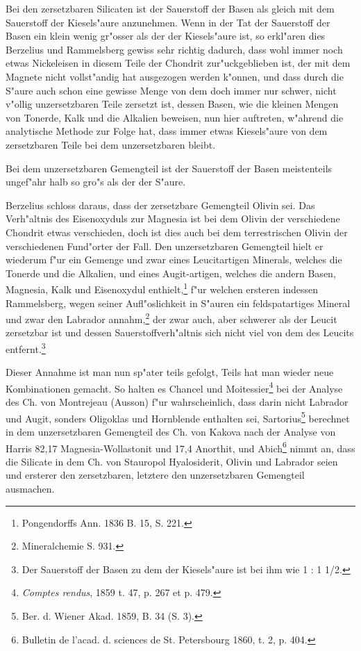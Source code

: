 \documentclass[a4paper, 11pt, oneside]{article}
\begin{document}
Bei den zersetzbaren Silicaten ist der Sauerstoff der Basen als gleich mit dem Sauerstoff der Kiesels"aure anzunehmen. Wenn in der Tat der Sauerstoff der Basen ein klein wenig gr"osser als der der Kiesels"aure ist, so erkl"aren dies Berzelius und Rammelsberg gewiss sehr richtig dadurch, dass wohl immer noch etwas Nickeleisen in diesem Teile der Chondrit zur"uckgeblieben ist, der mit dem Magnete nicht vollst"andig hat ausgezogen werden k"onnen, und dass durch die S"aure auch schon eine gewisse Menge von dem doch immer nur schwer, nicht v"ollig unzersetzbaren Teile zersetzt ist, dessen Basen, wie die kleinen Mengen von Tonerde, Kalk und die Alkalien beweisen, nun hier auftreten, w"ahrend die analytische Methode zur Folge hat, dass immer etwas Kiesels"aure von dem zersetzbaren Teile bei dem unzersetzbaren bleibt.

Bei dem unzersetzbaren Gemengteil ist der Sauerstoff der Basen meistenteils ungef"ahr halb so gro"s als der der S"aure.

Berzelius schloss daraus, dass der zersetzbare Gemengteil Olivin sei. Das Verh"altnis des Eisenoxyduls zur Magnesia ist bei dem Olivin der verschiedene Chondrit etwas verschieden, doch ist dies auch bei dem terrestrischen Olivin der verschiedenen Fund"orter der Fall. Den unzersetzbaren Gemengteil hielt er wiederum f"ur ein Gemenge und zwar eines Leucitartigen Minerals, welches die Tonerde und die Alkalien, und eines Augit-artigen, welches die andern Basen, Magnesia, Kalk und Eisenoxydul enthielt,\footnote{Pongendorffs Ann. 1836 B. 15, S. 221.} f"ur welchen ersteren indessen Rammelsberg, wegen seiner Aufl"oslichkeit in S"auren ein feldspatartiges Mineral und zwar den Labrador annahm,\footnote{Mineralchemie S. 931.} der zwar auch, aber schwerer als der Leucit zersetzbar ist und dessen Sauerstoffverh"altnis sich nicht viel von dem des Leucits entfernt.\footnote{Der Sauerstoff der Basen zu dem der Kiesels"aure ist bei ihm wie 1 : 1 1/2.}

Dieser Annahme ist man nun sp"ater teils gefolgt, Teils hat man wieder neue Kombinationen gemacht. So halten es Chancel und Moitessier\footnote{\emph{Comptes rendus}, 1859 t. 47, p. 267 et p. 479.} bei der Analyse des Ch. von Montrejeau (Ausson) f"ur wahrscheinlich, dass darin nicht Labrador und Augit, sonders Oligoklas und Hornblende enthalten sei, Sartorius\footnote{Ber. d. Wiener Akad. 1859, B. 34 (S. 3).} berechnet in dem unzersetzbaren Gemengteil des Ch. von Kakova nach der Analyse von Harris 82,17 Magnesia-Wollastonit und 17,4 Anorthit, und Abich\footnote{Bulletin de l'acad. d. sciences de St. Petersbourg 1860, t. 2, p. 404.} nimmt an, dass die Silicate in dem Ch. von Stauropol Hyalosiderit, Olivin und Labrador seien und ersterer den zersetzbaren, letztere den unzersetzbaren Gemengteil ausmachen.
\end{document}
